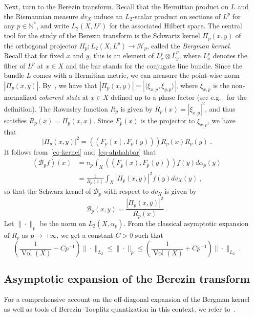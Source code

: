 \documentclass[11pt]{article}
\theoremstyle{definition}
\numberwithin{equation}{section}
\numberwithin{figure}{section}
\numberwithin{table}{section}
\DeclareMathOperator{\Vol}{Vol}
\newcommand{\N}{{\mathbb{N}}}
\newcommand{\cB}{{\mathcal{B}}}
\newcommand{\Hilb}{\mathcal{H}}
\renewcommand\leq {\leqslant}
\newcommand\< {\mathcal{h}}
\renewcommand\> {\mathcal{i}}
\newcommand*{\MK}{\mkern 2mu}
\begin{document}
Next, turn to the Berezin transform. Recall that the Hermitian product on $L$ and the Riemannian measure $dv_X$ induce an $L_2$-scalar product on sections of $L^p$ for any $p\in\N^*$, and write $L_2(X,L^p)$ for the associated Hilbert space. The central tool for the study of the Berezin transform is the Schwartz kernel $\Pi_p(x,y)$ of the orthogonal projector $\Pi_p:L_2(X,L^p) \to \Hilb_{p}$, called the \emph{Bergman kernel}. Recall that for fixed $x$ and $y$, this is an element of $L^p_x \otimes \bar{L}^p_y$, where $L^p_x$ denotes the fiber of $L^p$ at $x \in X$ and the bar stands for the conjugate line bundle. Since the bundle $L$ comes with a Hermitian metric, we can measure the point-wise norm $|\Pi_p(x,y)|$. By~\cite[Corollary~9.1.4$\MK$(2)]{LF}, we have that $|\Pi_p(x,y)| = |\langle \xi_{x,p},\xi_{y,p} \rangle|$, where $\xi_{x,p}$ is the non-normalized \emph{coherent state} at $x\in X$ defined up to a phase factor (see e.g.~\cite{CP,LF} for the definition). The Rawnsley function $R_p$ is given by $R_p(x) = |\xi_{x,p}|^2$, and thus satisfies $R_p(x)=\Pi_p(x,x)$. Since $F_p(x)$ is the projector to $\xi_{x,p}$, we have that
\[
\big|\Pi_p(x,y)\big|^2 = ((F_p(x),F_p(y))) R_p(x)R_p(y)\;.
\]
It follows from~\eqref{eq-kernel} and~\eqref{eq-alphahbar} that
\begin{equation}\label{Bpfla}
\begin{aligned}
(\cB_p f)(x) &= n_p \int_X ((F_p(x),F_p(y)))f(y) d\alpha_p(y)\\
&= \frac{1}{R_p(x)} \int_X |\Pi_p(x,y)|^2 f(y) dv_X(y)\;,
\end{aligned}
\end{equation}
so that the Schwarz kernel of $\cB_p$ with respect to $dv_X$ is given by
\begin{equation}\label{eq-schwarzkernelberezin}
\cB_p(x,y)= \frac{|\Pi_p(x,y)|^2}{R_p(x)}\;.
\end{equation}
Let $\|\cdot\|_p$ be the norm on $L_2(X,\alpha_p)$. From the classical asymptotic expansion of $R_p$ as $p \to +\infty$, we get a constant $C>0$ such that
\begin{equation}\label{diagexp}
\left(\frac{1}{\Vol(X)}- Cp^{-1}\right)\|\cdot\|_{L_2}
\leq\|\cdot\|_p
\leq\left(\frac{1}{\Vol(X)}+ Cp^{-1}\right)\|\cdot\|_{L_2}\;.
\end{equation}

\subsection{Asymptotic expansion of the Berezin transform}
For a comprehensive account on the off-diagonal expansion of the Bergman kernel as well as tools of Berezin--Toeplitz quantization in this context, we refer to~\cite{MM07}.
\end{document}
